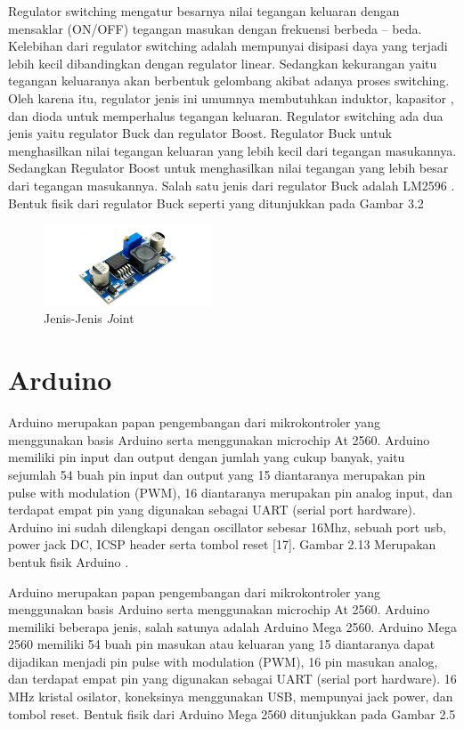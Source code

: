 Regulator switching mengatur besarnya nilai tegangan keluaran dengan mensaklar (ON/OFF) tegangan masukan dengan frekuensi berbeda – beda. Kelebihan dari regulator switching adalah mempunyai disipasi daya yang terjadi lebih kecil dibandingkan dengan regulator linear. Sedangkan kekurangan yaitu tegangan keluaranya akan berbentuk gelombang akibat adanya proses switching. Oleh karena itu, regulator jenis ini umumnya membutuhkan induktor, kapasitor , dan dioda untuk memperhalus tegangan keluaran. Regulator switching ada dua jenis yaitu regulator Buck dan regulator Boost. Regulator Buck untuk menghasilkan nilai tegangan keluaran yang lebih kecil dari tegangan masukannya. Sedangkan Regulator Boost untuk menghasilkan nilai tegangan yang lebih besar dari tegangan masukannya. Salah satu jenis dari regulator Buck adalah LM2596 . Bentuk fisik dari regulator Buck seperti yang ditunjukkan pada Gambar 3.2

	\begin{figure}[H]
	\centering
	\includegraphics[width=5cm]{gambar/lm2596.jpg}
	\caption{Jenis-Jenis \emph Joint}
\end{figure}

\section{Arduino}
Arduino  merupakan papan pengembangan dari mikrokontroler yang menggunakan basis Arduino serta menggunakan microchip At 2560. Arduino  memiliki pin input dan output dengan jumlah yang cukup banyak, yaitu sejumlah 54 buah pin input dan output yang 15 diantaranya merupakan pin pulse with modulation (PWM), 16 diantaranya merupakan pin analog input, dan terdapat empat pin yang digunakan sebagai UART (serial port hardware). Arduino ini sudah dilengkapi dengan oscillator sebesar 16Mhz, sebuah port usb, power jack DC, ICSP header serta tombol reset [17]. Gambar 2.13 Merupakan bentuk fisik Arduino .

Arduino merupakan papan pengembangan dari mikrokontroler yang menggunakan basis Arduino serta menggunakan microchip At 2560. Arduino memiliki beberapa jenis, salah satunya adalah Arduino Mega 2560. Arduino Mega 2560 memiliki 54 buah pin masukan atau keluaran yang 15 diantaranya dapat dijadikan menjadi pin pulse with modulation (PWM), 16 pin masukan analog, dan terdapat empat pin yang digunakan sebagai UART (serial port hardware). 16 MHz kristal osilator, koneksinya menggunakan USB, mempunyai jack power, dan tombol reset. Bentuk fisik dari Arduino Mega 2560 ditunjukkan pada Gambar 2.5

